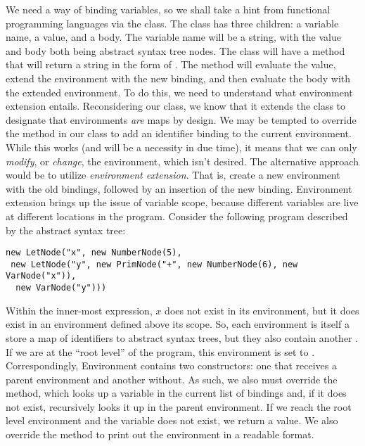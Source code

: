 We need a way of binding variables, so we shall take a hint from functional programming languages via the  class. The  class has three children: a variable name, a value, and a body. The variable name will be a string, with the value and body both being abstract syntax tree nodes. The  class will have a  method that will return a string in the form of . The  method will evaluate the value, extend the environment with the new binding, and then evaluate the body with the extended environment. To do this, we need to understand what environment extension entails. Reconsidering our  class, we know that it extends the  class to designate that environments \textit{are} maps by design. We may be tempted to override the  method in our  class to add an identifier binding to the current environment. While this works (and will be a necessity in due time), it means that we can only \textit{modify}, or \textit{change}, the environment, which isn't desired. The alternative approach would be to utilize \textit{environment extension}. That is, create a new environment with the old bindings, followed by an insertion of the new binding. Environment extension brings up the issue of variable scope, because different variables are live at different locations in the program. Consider the following program described by the abstract syntax tree:

\begin{verbatim}
new LetNode("x", new NumberNode(5), 
 new LetNode("y", new PrimNode("+", new NumberNode(6), new VarNode("x")), 
  new VarNode("y")))
\end{verbatim}
  
Within the inner-most  expression, $x$ does not exist in its environment, but it does exist in an environment defined above its scope. So, each environment is itself a store a map of identifiers to abstract syntax trees, but they also contain another . If we are at the ``root level'' of the program, this environment is set to . Correspondingly, Environment contains two constructors: one that receives a parent environment and another without. As such, we also must override the  method, which looks up a variable in the current list of bindings and, if it does not exist, recursively looks it up in the parent environment. If we reach the root level environment and the variable does not exist, we return a  value. We also override the  method to print out the environment in a readable format.

